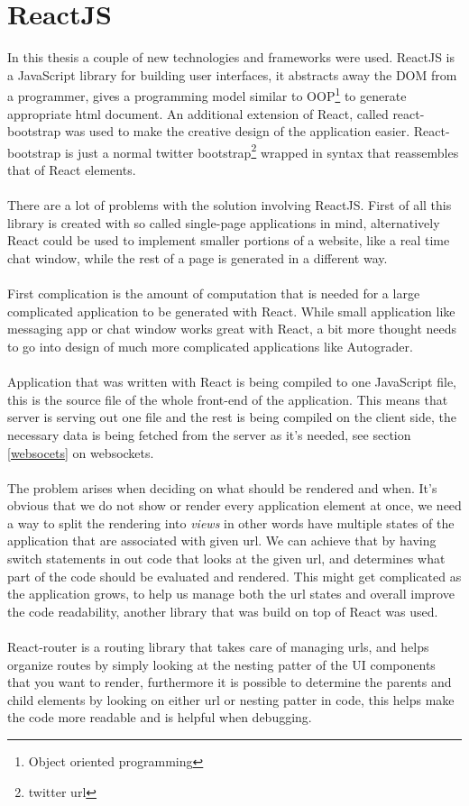 \section{ReactJS}\label{technologies}
In this thesis a couple of new technologies and frameworks were used. ReactJS is a JavaScript library for building user interfaces, it abstracts away the DOM from a programmer, gives a programming model similar to OOP\footnote{Object oriented programming}  to generate appropriate html document. An additional extension of React, called react-bootstrap was used to make the creative design of the application easier. React-bootstrap is just a normal twitter bootstrap\footnote{twitter url} wrapped in syntax that reassembles that of React elements.\\\\
There are a lot of problems with the solution involving ReactJS. First of all this library is created with so called single-page applications in mind, alternatively React could be used to implement smaller portions of a website, like a real time chat window, while the rest of a page is generated in a different way.\\\\
First complication is the amount of computation that is needed for a large complicated application to be generated with React. While small application like messaging app or chat window works great with React, a bit more thought needs to go into design of much more complicated applications like Autograder. \\\\
Application that was written with React is being compiled to one JavaScript file, this is the source file of the whole front-end of the application. This means that server is serving out one file and the rest is being compiled on the client side, the necessary data is being fetched from the server as it's needed, see section \ref{websocets} on websockets.\\\\
The problem arises when deciding on what should be rendered and when. It's obvious that we do not show or render every application element at once, we need a way to split the rendering into \emph{views} in other words have multiple states of the application that are associated with given url. We can achieve that by having switch statements in out code that looks at the given url, and determines what part of the code should be evaluated and rendered. This might get complicated as the application grows, to help us manage both the url states and overall improve the code readability, another library that was build on top of React was used.\\\\
React-router is a routing library that takes care of managing urls, and helps organize routes by simply looking at the nesting patter of the UI components that you want to render, furthermore it is possible to determine the parents and child elements by looking on either url or nesting patter in code, this helps make the code more readable and is helpful when debugging.

